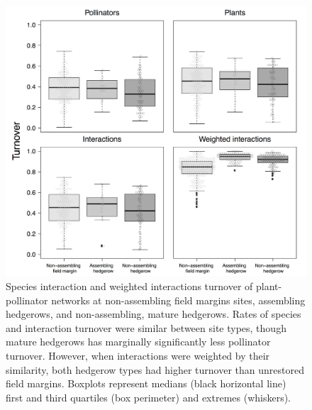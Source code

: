 \documentclass[12pt]{article}
\begin{document}
\begin{figure}
  \centering
  \includegraphics[width=1\textwidth]{figures/turnover_panels.jpeg}
  \caption{Species interaction and weighted interactions turnover
    of plant-pollinator networks at non-assembling field margins
    sites, assembling hedgerows, and non-assembling, mature
    hedgerows. Rates of species and interaction turnover were similar
    between site types, though mature hedgerows has marginally
    significantly less pollinator turnover.  However, when
    interactions were weighted by their similarity, both hedgerow
    types had higher turnover than unrestored field margins. Boxplots
    represent medians (black horizontal line) first and third
    quartiles (box perimeter) and extremes (whiskers). }
  \label{fig:beta}
\end{figure}
\clearpage
\end{document}
